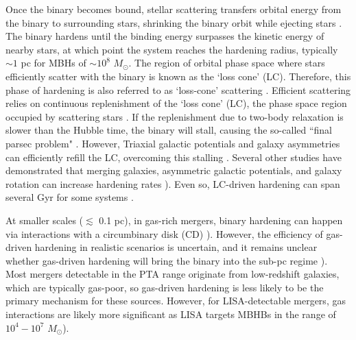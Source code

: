 \documentclass{book}
\newcommand{\msun}{\ensuremath{M_{\odot}}}
\begin{document}
Once the binary becomes bound, stellar scattering transfers orbital energy from the binary to surrounding stars, shrinking the binary orbit while ejecting stars \citep{sesana2008, Merritt_review_2005}. The binary hardens until the binding energy surpasses the kinetic energy of nearby stars, at which point the system reaches the hardening radius, typically $\sim 1$ pc for MBHs of $\sim 10^8$ \msun \citep{Begelman1980,milosavljevic_final_2003}. The region of orbital phase space where stars efficiently scatter with the binary is known as the `loss cone' (LC). Therefore, this phase of hardening is also referred to as `loss-cone' scattering \citep{Begelman1980,quinlan_dynamical_1996,quinlan_dynamical_1997,Merritt_review_2005}.  Efficient scattering relies on continuous replenishment of the `loss cone' (LC), the phase space region occupied by scattering stars \citep{Yu_2002}.  If the replenishment due to two-body relaxation is slower than the Hubble time, the binary will stall, causing the so-called ``final parsec problem" \citep{milosavljevic_final_2003}. However, Triaxial galactic potentials and galaxy asymmetries can efficiently refill the LC, overcoming this stalling \citep{Yu_2002}. Several other studies have demonstrated that merging galaxies, asymmetric galactic potentials, and galaxy rotation can increase hardening rates \citep{holleybockelmann2006lossconetriaxialgalaxies,berczik_2006,Holley_Bockelmann_2010,Preto_2011,Khan_2011,Holley-Bockelmann2015,Khan_2016}). Even so, LC-driven hardening can span several Gyr for some systems \citep{Kelley_2017a}.

At smaller scales ($\lesssim$ 0.1 pc), in gas-rich mergers, binary hardening can happen via interactions with a circumbinary disk (CD) \citep{Dotti2010,cuadra_massive_2009,nixon_tearing_2013,goicovic_infalling_2017,siwek_orbital_2023,siwek_preferential_2023}). However, the efficiency of gas-driven hardening in realistic scenarios is uncertain, and it remains unclear whether gas-driven hardening will bring the binary into the sub-pc regime \citep{lodato_black_2009,moody_hydrodynamic_2019,munoz_circumbinary_2020}). Most mergers detectable in the PTA range originate from low-redshift galaxies, which are typically gas-poor, so gas-driven hardening is less likely to be the primary mechanism for these sources. However, for LISA-detectable mergers, gas interactions are likely more significant as LISA targets MBHBs in the range of $10^4 - 10^7$ \msun \citep{dotti_supermassive_2007}).
\end{document}
